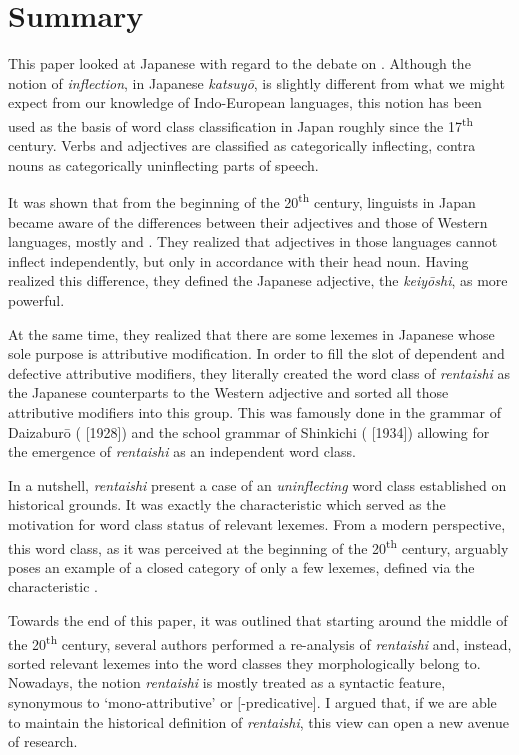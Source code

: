 \documentclass[output=paper,colorlinks,citecolor=brown]{langscibook}
\begin{document}
\section{Summary} \label{12sec6}

This paper looked at Japanese with regard to the debate on \emph{}. Although the notion of \emph{inflection}, in Japanese \emph{katsuyō}, is slightly different from what we might expect from our knowledge of Indo-European languages, this notion has been used as the basis of word class classification in Japan roughly since the 17\textsuperscript{th} century. Verbs and adjectives are classified as categorically inflecting, contra nouns as categorically uninflecting parts of speech.

It was shown that from the beginning of the 20\textsuperscript{th} century, linguists in Japan became aware of the differences between their adjectives and those of Western languages, mostly  and . They realized that adjectives in those languages cannot inflect independently, but only in accordance with their head noun. Having realized this difference, they defined the Japanese adjective, the \emph{keiyōshi}, as more powerful.

At the same time, they realized that there are some lexemes in Japanese whose sole purpose is attributive modification. In order to fill the slot of dependent and defective attributive modifiers, they literally created the word class of \emph{rentaishi} as the Japanese counterparts to the Western adjective and sorted all those attributive modifiers into this group. This was famously done in the grammar of \citeauthor{matsushita1976} Daizaburō (\citeyear{matsushita1976} [1928]) and the school grammar of \citeauthor{hashimoto1948} Shinkichi (\citeyear{hashimoto1948} [1934]) allowing for the emergence of \emph{rentaishi} as an independent word class.

In a nutshell, \emph{rentaishi} present a case of an \emph{uninflecting} word class established on historical grounds. It was exactly the characteristic \emph{} which served as the motivation for word class status of relevant lexemes. From a modern perspective, this word class, as it was perceived at the beginning of the 20\textsuperscript{th} century, arguably poses an example of a closed category of only a few lexemes, defined via the characteristic \emph{}.

Towards the end of this paper, it was outlined that starting around the middle of the 20\textsuperscript{th} century, several authors performed a re-analysis of \emph{rentaishi} and, instead, sorted relevant lexemes into the word classes they morphologically belong to. Nowadays, the notion \emph{rentaishi} is mostly treated as a syntactic feature, synonymous to `mono-attributive' or [-predicative]. I argued that, if we are able to maintain the historical definition of \emph{rentaishi}, this view can open a new avenue of research.
\end{document}
